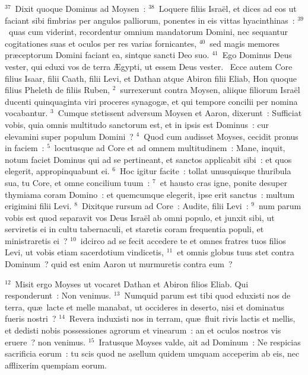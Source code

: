 ${}^{37}$~Dixit quoque Dominus ad Moysen~:
${}^{38}$~Loquere filiis Isra\"el, et dices ad eos ut faciant sibi fimbrias per angulos palliorum, ponentes in eis vittas hyacinthinas~:
${}^{39}$~quas cum viderint, recordentur omnium mandatorum Domini, nec sequantur cogitationes suas et oculos per res varias fornicantes,
${}^{40}$~sed magis memores pr\ae ceptorum Domini faciant ea, sintque sancti Deo suo.
${}^{41}$~Ego Dominus Deus vester, qui eduxi vos de terra \AE gypti, ut essem Deus vester.
~\lettrine[lines=10,image=true,loversize=0.05,lraise=-0.03]{E}{}cce autem Core filius Isaar, filii Caath, filii Levi, et Dathan atque Abiron filii Eliab, Hon quoque filius Pheleth de filiis Ruben,
${}^{2}$~surrexerunt contra Moysen, aliique filiorum Isra\"el ducenti quinquaginta viri proceres synagog\ae , et qui tempore concilii per nomina vocabantur.
${}^{3}$~Cumque stetissent adversum Moysen et Aaron, dixerunt~: Sufficiat vobis, quia omnis multitudo sanctorum est, et in ipsis est Dominus~: cur elevamini super populum Domini~?
${}^{4}$~Quod cum audisset Moyses, cecidit pronus in faciem~:
${}^{5}$~locutusque ad Core et ad omnem multitudinem~: Mane, inquit, notum faciet Dominus qui ad se pertineant, et sanctos applicabit sibi~: et quos elegerit, appropinquabunt ei.
${}^{6}$~Hoc igitur facite~: tollat unusquisque thuribula sua, tu Core, et omne concilium tuum~:
${}^{7}$~et hausto cras igne, ponite desuper thymiama coram Domino~: et quemcumque elegerit, ipse erit sanctus~: multum erigimini filii Levi.
${}^{8}$~Dixitque rursum ad Core~: Audite, filii Levi~:
${}^{9}$~num parum vobis est quod separavit vos Deus Isra\"el ab omni populo, et junxit sibi, ut serviretis ei in cultu tabernaculi, et staretis coram frequentia populi, et ministraretis ei~?
${}^{10}$~idcirco ad se fecit accedere te et omnes fratres tuos filios Levi, ut vobis etiam sacerdotium vindicetis,
${}^{11}$~et omnis globus tuus stet contra Dominum~? quid est enim Aaron ut murmuretis contra eum~?


${}^{12}$~Misit ergo Moyses ut vocaret Dathan et Abiron filios Eliab. Qui responderunt~: Non venimus.
${}^{13}$~Numquid parum est tibi quod eduxisti nos de terra, qu\ae\ lacte et melle manabat, ut occideres in deserto, nisi et dominatus fueris nostri~?
${}^{14}$~Revera induxisti nos in terram, qu\ae\ fluit rivis lactis et mellis, et dedisti nobis possessiones agrorum et vinearum~: an et oculos nostros vis eruere~? non venimus.
${}^{15}$~Iratusque Moyses valde, ait ad Dominum~: Ne respicias sacrificia eorum~: tu scis quod ne asellum quidem umquam acceperim ab eis, nec afflixerim quempiam eorum.


